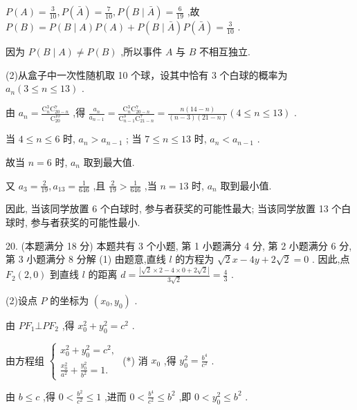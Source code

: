 \documentclass[10pt]{article}
\begin{document}
\(P\left( A\right)  = \frac{3}{10},P\left( \bar{A}\right)  = \frac{7}{10},P\left( {B \mid  \bar{A}}\right)  = \frac{6}{19}\) ,故 \(P\left( B\right)  = P\left( {B \mid  A}\right) P\left( A\right)  + P\left( {B \mid  \bar{A}}\right) P\left( \bar{A}\right)  = \frac{3}{10}\) .

因为 \(P\left( {B \mid  A}\right)  \neq  P\left( B\right)\) ,所以事件 \(A\) 与 \(B\) 不相互独立.

(2)从盒子中一次性随机取 10 个球，设其中恰有 3 个白球的概率为 \({a}_{n}\left( {3 \leq  n \leq  {13}}\right)\) .

由 \({a}_{n} = \frac{{\mathrm{C}}_{n}^{3}{\mathrm{C}}_{{20} - n}^{7}}{{\mathrm{C}}_{20}^{10}}\) ,得 \(\frac{{a}_{n}}{{a}_{n - 1}} = \frac{{\mathrm{C}}_{n}^{3}{\mathrm{C}}_{{20} - n}^{7}}{{\mathrm{C}}_{n - 1}^{3}{\mathrm{C}}_{{21} - n}^{7}} = \frac{n\left( {{14} - n}\right) }{\left( {n - 3}\right) \left( {{21} - n}\right) }\left( {4 \leq  n \leq  {13}}\right)\) .

当 \(4 \leq  n \leq  6\) 时, \({a}_{n} > {a}_{n - 1}\) ; 当 \(7 \leq  n \leq  {13}\) 时, \({a}_{n} < {a}_{n - 1}\) .

故当 \(n = 6\) 时, \({a}_{n}\) 取到最大值.

又 \({a}_{3} = \frac{2}{19},{a}_{13} = \frac{1}{646}\) ,且 \(\frac{2}{19} > \frac{1}{646}\) ,当 \(n = {13}\) 时, \({a}_{n}\) 取到最小值.

因此, 当该同学放置 6 个白球时, 参与者获奖的可能性最大; 当该同学放置 13 个白球时, 参与者获奖的可能性最小.

20. (本题满分 18 分) 本题共有 3 个小题, 第 1 小题满分 4 分, 第 2 小题满分 6 分, 第 3 小题满分 8 分解 (1) 由题意,直线 \(l\) 的方程为 \(\sqrt{2}x - {4y} + 2\sqrt{2} = 0\) . 因此,点 \({F}_{2}\left( {2,0}\right)\) 到直线 \(l\) 的距离 \(d = \frac{\left| \sqrt{2} \times  2 - 4 \times  0 + 2\sqrt{2}\right| }{3\sqrt{2}} = \frac{4}{3}\) .

(2)设点 \(P\) 的坐标为 \(\left( {{x}_{0},{y}_{0}}\right)\) .

由 \(P{F}_{1} \bot  P{F}_{2}\) ,得 \({x}_{0}^{2} + {y}_{0}^{2} = {c}^{2}\) .

由方程组 \(\left\{  \begin{array}{l} {x}_{0}^{2} + {y}_{0}^{2} = {c}^{2}, \\  \frac{{x}_{0}^{2}}{{a}^{2}} + \frac{{y}_{0}^{2}}{{b}^{2}} = 1. \end{array}\right.\) (*) 消 \({x}_{0}\) ,得 \({y}_{0}^{2} = \frac{{b}^{4}}{{c}^{2}}\) .

由 \(b \leq  c\) ,得 \(0 < \frac{{b}^{2}}{{c}^{2}} \leq  1\) ,进而 \(0 < \frac{{b}^{4}}{{c}^{2}} \leq  {b}^{2}\) ,即 \(0 < {y}_{0}^{2} \leq  {b}^{2}\) .
\end{document}
